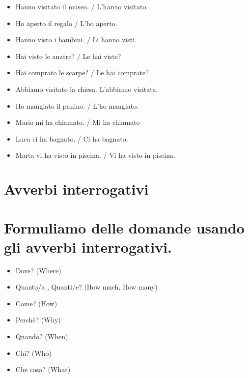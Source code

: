 \documentclass[letter,11pt]{article}
\begin{document}
\begin{multicols}{2}
\begin{itemize}
    \item Hanno visitato il museo. / L'hanno visitato.
    \item Ho aperto il regalo / L'ho aperto.
    \item Hanno visto i bambini. / Li hanno visti.
    \item Hai visto le anatre? / Le hai viste?
    \item Hai comprato le scarpe? / Le hai comprate?
    \item Abbiamo visitato la chiesa. L'abbiamo visitata.
    \item Ho mangiato il panino. / L'ho mangiato.
    \item Mario mi ha chiamato. / Mi ha chiamato
    \item Luca ci ha bagnato. / Ci ha bagnato.
    \item Marta vi ha visto in piscina. / Vi ha visto in piscina.


\end{itemize}
\end{multicols}


\vskip 0.2in

\section*{Avverbi interrogativi}
\section*{Formuliamo delle domande usando gli avverbi interrogativi.}
\vskip 0.2in

\begin{multicols}{2}
\begin{itemize}

    \item Dove? (Where)
    \item Quanto/a , Quanti/e? (How much, How many)
    \item Come? (How)
    \item Perchè? (Why)
    \item Quando? (When)
    \item Chi? (Who)
    \item Che cosa? (What)

\end{itemize}
\end{multicols}
\end{document}
